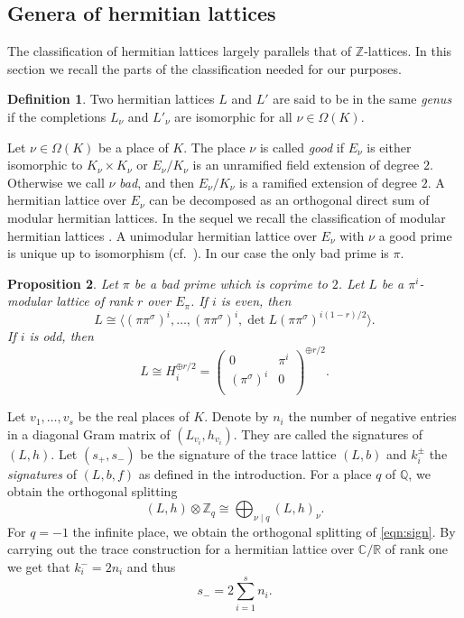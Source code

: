 \documentclass{amsart}
\theoremstyle{definition}
\newtheorem{definition}{Definition}[section]
\theoremstyle{plain}
\newtheorem{proposition}[definition]{Proposition}
\newcommand{\QQ}{\mathbb{Q}}
\newcommand{\RR}{\mathbb{R}}
\newcommand{\CC}{\mathbb{C}}
\newcommand{\ZZ}{\mathbb{Z}}
\begin{document}
\subsection{Genera of hermitian lattices}
The classification of hermitian lattices largely parallels that of $\ZZ$-lattices. In this section we recall the parts of the classification needed for our purposes.
\begin{definition}
Two hermitian lattices $L$ and $L'$ are said to be in the same \emph{genus} if the completions
$L_\nu$ and $L'_\nu$ are isomorphic for all $\nu \in \Omega(K)$.
\end{definition}
Let $\nu \in \Omega(K)$ be a place of $K$.
The place $\nu$ is called \emph{good} if $E_\nu$ is either isomorphic to $K_\nu \times K_\nu$ or $E_\nu/K_\nu$ is an unramified field extension of degree $2$. Otherwise we call $\nu$ \emph{bad}, and then $E_\nu/K_\nu$ is a ramified extension of degree $2$.
A hermitian lattice over $E_\nu$ can be decomposed as an orthogonal direct sum of modular hermitian lattices. In the sequel we recall the classification of modular hermitian lattices \cite{jacobowitz}.
A unimodular hermitian lattice over $E_\nu$ with $\nu$ a good prime is unique up to isomorphism (cf.\ \cite[Prop.\ 3.3.5]{kirschmer:hermitian}).
In our case the only bad prime is $\pi$.
\begin{proposition}\label{prop:modular}\cite[Prop.\ 3.3.5]{kirschmer:hermitian}
Let $\pi$ be a bad prime which is coprime to $2$. Let $L$ be a
$\pi^i$-modular lattice of rank $r$ over $E_\pi$.
If $i$ is even, then \[L \cong \langle (\pi \pi^\sigma)^i,\dots, (\pi \pi^\sigma)^i, \det L (\pi \pi^\sigma)^{i(1-r)/2}\rangle.\]
If $i$ is odd, then
\[L \cong H_{i}^{\oplus r/2} = \left(
\begin{matrix}
0 & \pi^i \\
(\pi^\sigma)^i & 0\\
\end{matrix}
\right)^{\oplus r/2}.\]
\end{proposition}

Let $v_1, \dots , v_s$ be the real places of $K$.
Denote by $n_i$ the number of negative entries in a diagonal Gram matrix of $(L_{v_i},h_{v_i})$. They are called
the signatures of $(L,h)$.
Let $(s_+,s_-)$ be the signature of the trace lattice $(L,b)$ and $k^\pm_i$ the \emph{signatures} of $(L,b,f)$ as defined in the introduction.
For a place $q$ of $\QQ$, we obtain the orthogonal splitting
\[(L,h) \otimes \ZZ_q \cong \bigoplus_{\nu \mid q} (L,h)_\nu.\]
For $q=-1$ the infinite place, we obtain the orthogonal splitting of \cref{eqn:sign}.
By carrying out the trace construction for a hermitian lattice over $\CC/\RR$ of rank one we get that $k_i^-=2n_i$ and thus
\begin{equation*}
s_- = 2 \sum_{i=1}^s n_i.
\end{equation*}
\end{document}
